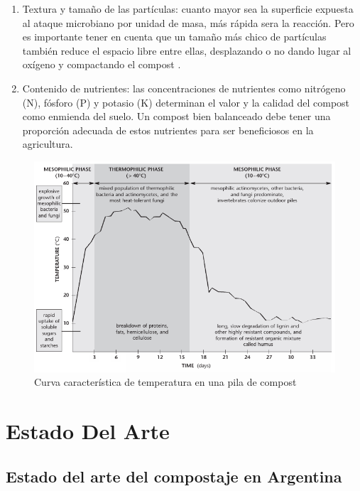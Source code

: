 \begin{enumerate}
    \item Textura y tamaño de las partículas: cuanto mayor sea la superficie expuesta al ataque microbiano por unidad de masa, más rápida sera la reacción. Pero es importante tener en cuenta que un tamaño más chico de partículas también reduce  el espacio libre entre ellas, desplazando o no dando lugar al oxígeno y compactando el compost \citep{ManualBuenasPracticas}.
    \item Contenido de nutrientes: las concentraciones de nutrientes como nitrógeno (N), fósforo (P) y potasio (K) determinan el valor y la calidad del compost como enmienda del suelo. Un compost bien balanceado debe tener una proporción adecuada de estos nutrientes para ser beneficiosos en la agricultura. \citep{Risti}
 \end{enumerate}
 

 \begin{figure}[H]
	\centering
	\includegraphics[scale=.7]{Figures/Compost Caracteristicas/Curva Temperatura.PNG}
	\caption{Curva característica de temperatura en una pila de compost \citep{curvaTemp}}
	\label{fig:curvatemp}
\end{figure}

\section{Estado Del Arte} %


\subsection{Estado del arte del compostaje en Argentina}
\label{sec:EstadoArteArgentina}

